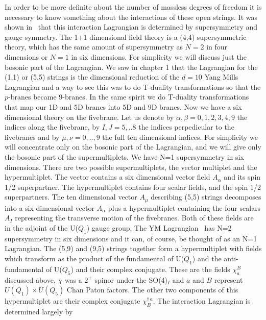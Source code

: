 In order to be more definite about the number of massless
degrees of freedom 
it is necessary to know something about the interactions of
these open strings. It was shown in 
\dgl\ that this interaction Lagrangian is determined by 
supersymmetry and  gauge symmetry.
 The 1+1 dimensional field
theory is a (4,4)  supersymmetric theory, which has  the same
amount of supersymmetry as $N=2$ in four dimensions or $N=1$ in 
six dimensions.
For simplicity we will discuss just the bosonic part of the
Lagrangian. We saw in chapter 1 that the Lagrangian for the
(1,1) or (5,5) strings is the dimensional reduction 
of the $d=10$ Yang Mills Lagrangian and  a way to see this
was to do T-duality transformations so that the 
$p$-branes became 9-branes.
In the same spirit we do T-duality transformations that
map our 1D and 5D branes into 5D and 9D branes.
Now we have a six dimensional theory on the fivebrane. 
Let us denote by $\alpha, \beta =0,1,2,3,4,9 $ the indices
along the fivebrane, by $I,J=5,..8 $ the indices perpedicular
to the fivebranes and by $\mu,\nu = 0,..,9$ the full ten
dimensional indices.
For simplicity we will concentrate only on the bosonic
part of the Lagrangian, and we will give only the
bosonic part of the supermultiplets.
We have N=1 supersymmetry in six dimensions. There are two 
possible supermultiplets, the vector multiplet and the
hypermultiplet. The vector contains a six dimensional
vector field $A_\alpha $ and its spin 1/2 superpartner.
The hypermultiplet contains four scalar fields,
and the spin 1/2 superpartners.
The ten dimensional vector $A_\mu$ describing (5,5) strings 
decomposes into 
a six dimensional vector $A_\alpha$ plus a hypermultiplet
containing the four scalars $A_I$ representing the transverse 
motion
of the fivebranes. Both of these fields are in the 
adjoint of the U($Q_1$) gauge group.
The YM Lagrangian \tendym\ has N=2 supersymmetry in six dimensions
and it can, of course, be thought of as an N=1 Lagrangian.
The  (5,9) and (9,5) strings together form a hypermultiplet
with fields which transform as the product of
the fundamental of U($Q_1$) and the anti-fundamental of U($Q_5$) and
their complex conjugate. These are the fields $\chi_a^B$ discussed
above, $\chi$ was a $2^+$ spinor under the SO(4)$_I$ and 
$a$ and $B$ represent $U(Q_1)\times \bar U(Q_5) $ Chan Paton 
factors. The other two components of this hypermultiplet 
are their complex conjugate  $ \chi^{\dagger \, a }_B$.
The interaction Lagrangian is determined largely by
